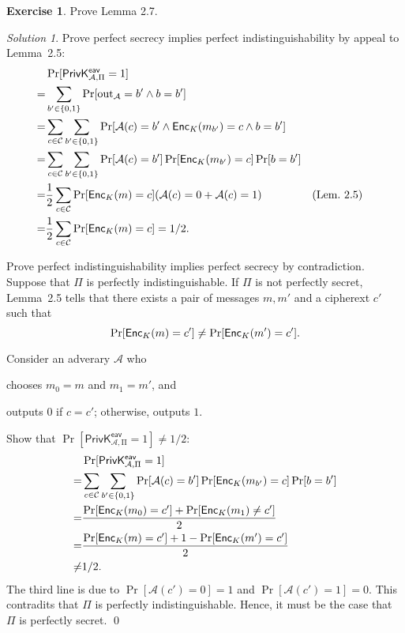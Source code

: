 \documentclass[titlepage,reqno]{amsart}
\theoremstyle{definition}
\newtheorem{exercise}{Exercise}[section]
\theoremstyle{remark}
\newtheorem*{solution}{Solution}
\begin{document}
\begin{exercise}
    Prove Lemma 2.7.

    \newcommand{\PrivKeav}[1]{\mathsf{PrivK^{eav}_{#1}}}
    \begin{solution} 
    Prove perfect secrecy implies perfect indistinguishability by appeal to Lemma~2.5:
    \begin{align*}
        &\Pr[\PrivKeav{\mathcal{A},\mathrm{\Pi}}=1] \\
        =& \sum_{b'\in\{0,1\}}\Pr[\mathrm{out}_\mathcal{A}=b' \wedge b=b']\\
        =& \sum_{c\in\mathcal{C}} \sum_{b'\in\{0,1\}} \Pr[\mathcal{A}(c)=b' \wedge \Enc_K(m_{b'}) = c \wedge b=b'] \\
        =& \sum_{c\in\mathcal{C}} \sum_{b'\in\{0,1\}}  \Pr[\mathcal{A}(c)=b'] \Pr[\Enc_K(m_{b'}) = c] \Pr[b = b'] \\
        =& \frac{1}{2} \sum_{c\in\mathcal{C}} \Pr[\Enc_K(m) = c](\mathcal{A}(c)=0 + \mathcal{A}(c)=1) && \text{(Lem.~2.5)}\\
        =&  \frac{1}{2} \sum_{c\in\mathcal{C}} \Pr[\Enc_K(m) = c] = 1/2.
    \end{align*}

    Prove perfect indistinguishability implies perfect secrecy by contradiction.
    Suppose that $\Pi$ is perfectly indistinguishable.
    If $\Pi$ is not perfectly secret, Lemma~2.5 tells that
    there exists a pair of messages $m, m'$ and a cipherext $c'$ such that
    \[
        \Pr[\mathsf{Enc}_K(m) = c'] \neq \Pr[\mathsf{Enc}_K(m') = c'].
    \]

    Consider an adverary $\mathcal{A}$ who
    \begin{enumerate*}
        \item chooses $m_0 = m$ and $m_1 = m'$, and
        \item outputs $0$ if $c = c'$; otherwise, outputs $1$. 
    \end{enumerate*}
    Show that $\Pr[\PrivKeav{\mathcal{A},\mathrm{\Pi}}=1] \neq 1/2$:
    \begin{align*}
        &\Pr[\PrivKeav{\mathcal{A},\mathrm{\Pi}}=1] \\
        =& \sum_{c\in\mathcal{C}} \sum_{b'\in\{0,1\}}  \Pr[\mathcal{A}(c)=b'] \Pr[\Enc_K(m_{b'}) = c] \Pr[b = b'] \\
        =& \frac{\Pr[\Enc_K(m_0)=c'] + \Pr[\Enc_K(m_1) \neq c']}{2} \\
        =& \frac{\Pr[\Enc_K(m)=c'] + 1 - \Pr[\Enc_K(m') = c']}{2} \\
        \neq& 1/2.
    \end{align*}
    The third line is due to $\Pr[\mathcal{A}(c')=0] = 1$ and $\Pr[\mathcal{A}(c') = 1] = 0$.
    This contradits that $\Pi$ is perfectly indistinguishable.
    Hence, it must be the case that $\Pi$ is perfectly secret.
    \qed
    \end{solution}
\end{exercise}
\end{document}
